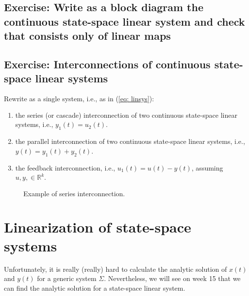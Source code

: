 \subsection{Exercise: Write as a block diagram the continuous state-space linear system and check that consists only of linear maps}

\subsection{Exercise: Interconnections of continuous state-space linear systems}
Rewrite as a single system, i.e., as in (\ref{eq: linsys}):

\begin{enumerate}
	\item the series (or cascade) interconnection of two continuous state-space linear systems, i.e., $y_1(t) = u_2(t)$.
	\item the parallel interconnection of two continuous state-space linear systems, i.e., $y(t) = y_1(t) + y_2(t)$.
	\item the feedback interconnection, i.e., $u_1(t) = u(t) - y(t)$, assuming $u, y, \in\mathbb{R}^k$.
\end{enumerate}

\begin{figure}
\centering
{}
	\caption{Example of series interconnection.}
	\label{fig: series}
\end{figure}

\section{Linearization of state-space systems}
Unfortunately, it is really (really) hard to calculate the analytic solution of $x(t)$ and $y(t)$ for a generic system $\Sigma$. Nevertheless, we will see on week 15 that we can find the analytic solution for a state-space linear system.

